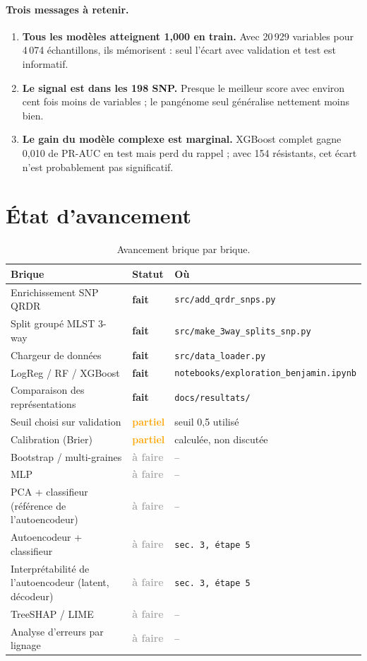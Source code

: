 \documentclass[11pt,a4paper]{article}
\newcommand{\ok}{\textcolor{secondary}{\textbf{fait}}}
\newcommand{\partiel}{\textcolor{orange}{\textbf{partiel}}}
\newcommand{\afaire}{\textcolor{darkgray}{\textbf{à faire}}}
\begin{document}
\paragraph{Trois messages à retenir.}
\begin{enumerate}[leftmargin=1.4em]
    \item \textbf{Tous les modèles atteignent 1,000 en train.} Avec 20\,929 variables pour 4\,074 échantillons, ils mémorisent : seul l'écart avec validation et test est informatif.
    \item \textbf{Le signal est dans les 198 SNP.} Presque le meilleur score avec environ cent fois moins de variables ; le pangénome seul généralise nettement moins bien.
    \item \textbf{Le gain du modèle complexe est marginal.} XGBoost complet gagne 0,010 de PR-AUC en test mais perd du rappel ; avec 154 résistants, cet écart n'est probablement pas significatif.
\end{enumerate}

\section{État d'avancement}
\label{sec:etat}

\begin{table}[H]
\centering
\caption{Avancement brique par brique.}
\label{tab:etat}
\small
\begin{tabularx}{\textwidth}{Xll}
\toprule
\textbf{Brique} & \textbf{Statut} & \textbf{Où} \\
\midrule
Enrichissement SNP QRDR & \ok & \texttt{src/add\_qrdr\_snps.py} \\
Split groupé MLST 3-way & \ok & \texttt{src/make\_3way\_splits\_snp.py} \\
Chargeur de données & \ok & \texttt{src/data\_loader.py} \\
LogReg / RF / XGBoost & \ok & \texttt{notebooks/exploration\_benjamin.ipynb} \\
Comparaison des représentations & \ok & \texttt{docs/resultats/} \\
Seuil choisi sur validation & \partiel & seuil 0,5 utilisé \\
Calibration (Brier) & \partiel & calculée, non discutée \\
Bootstrap / multi-graines & \afaire & -- \\
MLP & \afaire & -- \\
PCA + classifieur (référence de l'autoencodeur) & \afaire & -- \\
Autoencodeur + classifieur & \afaire & \texttt{sec.~3, étape 5} \\
Interprétabilité de l'autoencodeur (latent, décodeur) & \afaire & \texttt{sec.~3, étape 5} \\
TreeSHAP / LIME & \afaire & -- \\
Analyse d'erreurs par lignage & \afaire & -- \\
\bottomrule
\end{tabularx}
\end{table}
\end{document}
